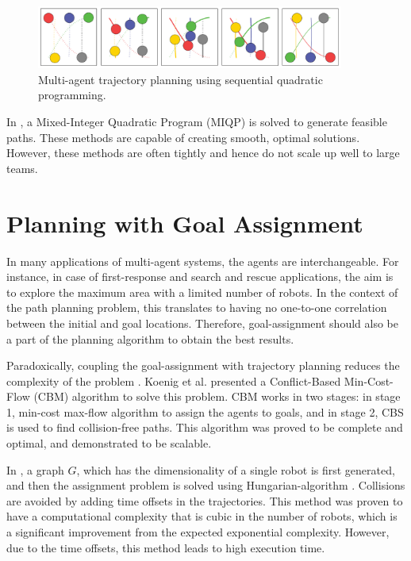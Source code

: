 \begin{figure}
\centering
\includegraphics[width=0.9\textwidth]{./images/dandrea_scp.png}
\caption{Multi-agent trajectory planning using sequential quadratic programming. \cite{augugliaro2012generation}}
\end{figure}

In \cite{mellinger2012mixed}, a Mixed-Integer Quadratic Program (MIQP) is solved to generate feasible paths. These methods are capable of creating smooth, optimal solutions. However, these methods are often tightly and hence do not scale  up well to large teams. 

\section{Planning with Goal Assignment}
In many applications of multi-agent systems, the agents are interchangeable. For instance, in case of first-response and search and rescue applications, the aim is to explore the maximum area with a limited number of robots. In the context of the path planning problem, this translates to having no one-to-one correlation between the initial and goal locations. Therefore, goal-assignment should also be a part of the planning algorithm to obtain the best results. 

Paradoxically, coupling the goal-assignment with trajectory planning reduces the complexity of the problem \cite{turpin2013trajectory}. Koenig et al. \cite{ma2016optimal} presented a Conflict-Based Min-Cost-Flow (CBM) algorithm to solve this problem. CBM works in two stages: in stage 1, min-cost max-flow algorithm \cite{goldberg1987solving} to assign the agents to goals, and in stage 2, CBS is used to find collision-free paths. This algorithm was proved to be complete and optimal, and demonstrated to be scalable. 

In \cite{turpin2014goal}, a graph $G$, which has the dimensionality of a single robot is first generated, and then the assignment problem is solved using Hungarian-algorithm \cite{kuhn1955hungarian}. Collisions are avoided by adding time offsets in the trajectories. This method was proven to have a computational complexity that is cubic in the number of robots, which is a significant improvement from the expected exponential complexity. However, due to the time offsets, this method leads to high execution time.
